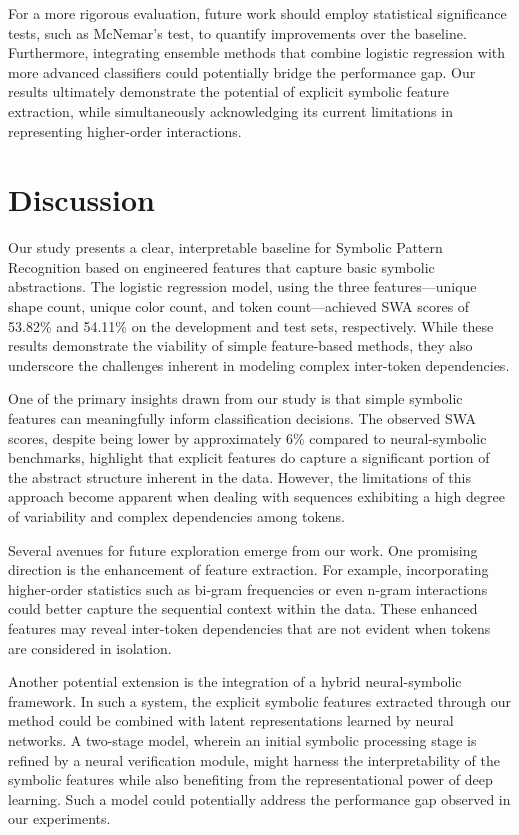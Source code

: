 \documentclass{article}
\begin{document}
For a more rigorous evaluation, future work should employ statistical significance tests, such as McNemar’s test, to quantify improvements over the baseline. Furthermore, integrating ensemble methods that combine logistic regression with more advanced classifiers could potentially bridge the performance gap. Our results ultimately demonstrate the potential of explicit symbolic feature extraction, while simultaneously acknowledging its current limitations in representing higher-order interactions.

\section{Discussion}
Our study presents a clear, interpretable baseline for Symbolic Pattern Recognition based on engineered features that capture basic symbolic abstractions. The logistic regression model, using the three features—unique shape count, unique color count, and token count—achieved SWA scores of 53.82\% and 54.11\% on the development and test sets, respectively. While these results demonstrate the viability of simple feature-based methods, they also underscore the challenges inherent in modeling complex inter-token dependencies.

One of the primary insights drawn from our study is that simple symbolic features can meaningfully inform classification decisions. The observed SWA scores, despite being lower by approximately 6\% compared to neural-symbolic benchmarks, highlight that explicit features do capture a significant portion of the abstract structure inherent in the data. However, the limitations of this approach become apparent when dealing with sequences exhibiting a high degree of variability and complex dependencies among tokens.

Several avenues for future exploration emerge from our work. One promising direction is the enhancement of feature extraction. For example, incorporating higher-order statistics such as bi-gram frequencies or even n-gram interactions could better capture the sequential context within the data. These enhanced features may reveal inter-token dependencies that are not evident when tokens are considered in isolation. 

Another potential extension is the integration of a hybrid neural-symbolic framework. In such a system, the explicit symbolic features extracted through our method could be combined with latent representations learned by neural networks. A two-stage model, wherein an initial symbolic processing stage is refined by a neural verification module, might harness the interpretability of the symbolic features while also benefiting from the representational power of deep learning. Such a model could potentially address the performance gap observed in our experiments.
\end{document}
